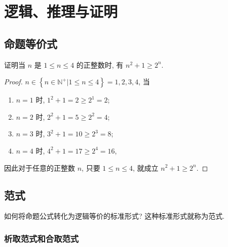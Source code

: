 \documentclass[10pt,UTF8]{book} %
\begin{document}

\chapter{逻辑、推理与证明}


\section{命题等价式}




\begin{example}
    证明当 $n$ 是 $1 \leqslant n \leqslant 4$ 的正整数时, 有 $n^2 + 1 \geqslant2^n$.
\begin{proof}
    $n \in \left\{ n \in \mathbb{N^+} | 1 \leqslant n \leqslant 4 \right\} = {1,2,3,4}$, 当
\begin{enumerate}
        \item $n=1$ 时, $1^2 + 1 = 2 \geqslant 2^1 = 2$;
        \item $n=2$ 时, $2^2 +1 = 5 \geqslant 2^2 =4$;
        \item $n=3$ 时, $3^2 + 1 = 10 \geqslant 2^3 = 8$;
        \item $n=4$ 时, $4^2 + 1  = 17 \geqslant 2^4 = 16$,
\end{enumerate}
    因此对于任意的正整数 $n$, 只要 $1 \leqslant n \leqslant 4$, 就成立 $n^2 + 1 \geqslant 2^n$.
\end{proof}
\end{example}

\section{范式}

如何将命题公式转化为逻辑等价的标准形式? 这种标准形式就称为范式.

\subsection{析取范式和合取范式}
\end{document}
